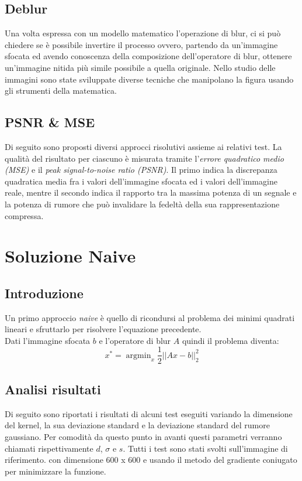 \documentclass{article}
\DeclareMathOperator*{\argmin}{argmin}
\begin{document}
\subsection{Deblur}
Una volta espressa con un modello matematico l'operazione di blur, ci si può chiedere se è possibile invertire il processo ovvero, partendo da un'immagine sfocata ed avendo conoscenza della composizione dell'operatore di blur, ottenere un'immagine nitida più simile possibile a quella originale.
Nello studio delle immagini sono state sviluppate diverse tecniche che manipolano la figura usando gli strumenti della matematica.

\subsection{PSNR \& MSE}
Di seguito sono proposti diversi approcci risolutivi assieme ai relativi test. La qualità del risultato per ciascuno è misurata tramite l'\textit{errore quadratico medio (MSE)} e il \textit{peak signal-to-noise ratio (PSNR)}.
Il primo indica la discrepanza quadratica media fra i valori dell'immagine sfocata ed i valori dell'immagine reale, mentre il secondo indica il rapporto tra la massima potenza di un segnale e la potenza di rumore che può invalidare la fedeltà della sua rappresentazione compressa.

\section{Soluzione Naive}
\subsection{Introduzione}
Un primo approccio \textit{naive} è quello di ricondursi al problema dei minimi quadrati lineari e sfruttarlo per risolvere l'equazione precedente.\\ 
Dati l'immagine sfocata $b$ e l'operatore di blur $A$ quindi il problema diventa:
$$ x^* = \argmin_x \frac{1}{2}||Ax - b||_2^2 $$

\subsection{Analisi risultati}
Di seguito sono riportati i risultati di alcuni test eseguiti variando la dimensione del kernel, la sua deviazione standard e la deviazione standard del rumore gaussiano. Per comodità da questo punto in avanti questi parametri verranno chiamati rispettivamente $d$, $\sigma$ e $s$. Tutti i test sono stati svolti sull'immagine di riferimento.
con dimensione 600 x 600 e usando il metodo del gradiente coniugato per minimizzare la funzione.
\end{document}

